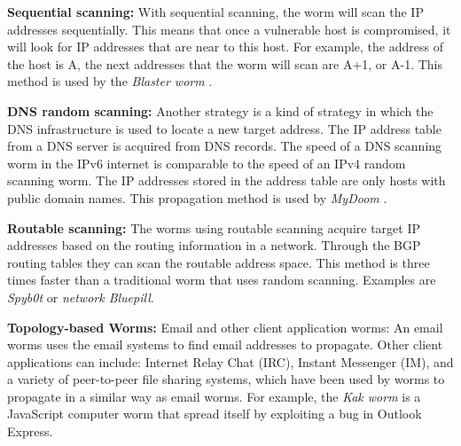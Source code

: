 \begin{description}
\item \textbf{Sequential scanning:}
With sequential scanning, the worm will scan the IP addresses sequentially. This means that once a vulnerable host is compromised, it will look for IP addresses that are near to this host. For example, the address of the host is A, the next addresses that the worm will scan are A+1, or A-1. This method is used by the \textit{Blaster worm} \citep{zou2006performance}.


\item \textbf{DNS random scanning:} Another strategy is a kind of strategy in which the DNS infrastructure is used to locate a new target address. The IP address table from a DNS server is acquired from DNS records. 
The speed of a DNS scanning worm in the IPv6 internet is comparable to the speed of an IPv4 random scanning worm. 
The IP addresses stored in the address table are only hosts with public domain names. This propagation method is used by \textit{MyDoom} \citep{kamra2005effect}.

\item \textbf{Routable scanning:} The worms using routable scanning acquire target IP addresses based on the routing information in a network. Through  the BGP routing tables they can scan the routable address space. This method is three times faster than a traditional worm that uses random scanning. Examples are \textit{Spyb0t} or \textit{network Bluepill}. 

\item \textbf{Topology-based Worms:} Email and other client application worms: An email worms uses the email systems to find email addresses to propagate. Other client applications can include: Internet Relay Chat (IRC), Instant Messenger (IM), and a variety of peer-to-peer
file sharing systems, which have been used by worms to propagate in a similar way as email worms. For example, the \textit{Kak worm} \citep{Kakworm} is a JavaScript computer worm that spread itself by exploiting a bug in Outlook Express. %


\end{description}
